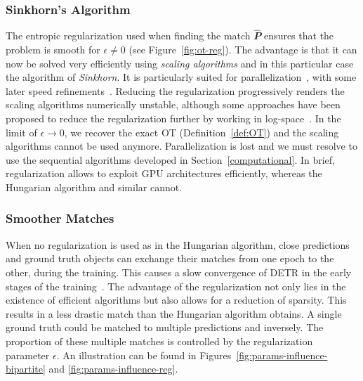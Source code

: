 \subsubsection{Sinkhorn's Algorithm}
The entropic regularization used when finding the match $\hat{\mathbfit{P}}$ ensures that the problem is smooth for $\epsilon \neq 0$ (see Figure~\ref{fig:ot-reg}). The advantage is that it can now be solved very efficiently using \emph{scaling algorithms} and in this particular case the algorithm of \emph{Sinkhorn}. It is particularly suited for parallelization~\cite{cuturi2013sinkhorn}, with some later speed refinements~\cite{greenkorn, screenkorn}. Reducing the regularization progressively renders the scaling algorithms numerically unstable, although some approaches have been proposed to reduce the regularization further by working in log-space~\cite{schmitzer2019stabilized,chizat2018scaling}. In the limit of $\epsilon \rightarrow 0$, we recover the exact OT (Definition~\ref{def:OT}) and the scaling algorithms cannot be used anymore. Parallelization is lost and we must resolve to use the sequential algorithms developed in Section~\ref{computational}. In brief, regularization allows to exploit GPU architectures efficiently, whereas the Hungarian algorithm and similar cannot.

\subsubsection{Smoother Matches}
When no regularization is used as in the Hungarian algorithm, close predictions and ground truth objects can exchange their matches from one epoch to the other, during the training. This causes a slow convergence of DETR in the early stages of the training~\cite{li2022dndetr}. The advantage of the regularization not only lies in the existence of efficient algorithms but also allows for a reduction of sparsity. This results in a less drastic match than the Hungarian algorithm obtains. A single ground truth could be matched to multiple predictions and inversely. The proportion of these multiple matches is controlled by the regularization parameter $\epsilon$. An illustration can be found in Figures~\ref{fig:params-influence-bipartite} and \ref{fig:params-influence-reg}.

